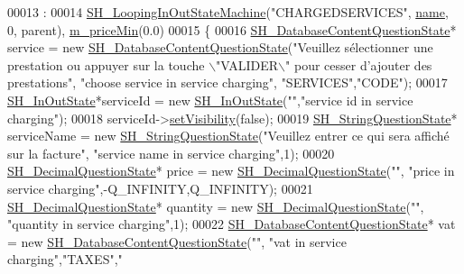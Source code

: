 \begin{DoxyCode}
00013                                                                     :
00014     \hyperlink{classSH__LoopingInOutStateMachine_ab183e4ef00fa1297e942b3a4d78b3523}{SH\_LoopingInOutStateMachine}(\textcolor{stringliteral}{"CHARGEDSERVICES"},
      \hyperlink{classSH__NamedObject_a9f686c6f2a5bcc08ad03d0cee0151f0f}{name}, 0, parent), \hyperlink{classSH__ServiceCharging_a44584a7ff1edd6ae03c4f77544136c13}{m\_priceMin}(0.0)
00015 \{
00016     \hyperlink{classSH__DatabaseContentQuestionState}{SH\_DatabaseContentQuestionState}* service = \textcolor{keyword}{new} 
      \hyperlink{classSH__DatabaseContentQuestionState}{SH\_DatabaseContentQuestionState}(\textcolor{stringliteral}{"Veuillez sélectionner une prestation ou
       appuyer sur la touche \(\backslash\)"VALIDER\(\backslash\)" pour cesser d'ajouter des prestations"}, \textcolor{stringliteral}{"choose service in service charging"},\textcolor{stringliteral}{
      "SERVICES"},\textcolor{stringliteral}{"CODE"});
00017     \hyperlink{classSH__InOutState}{SH\_InOutState}*serviceId = \textcolor{keyword}{new} \hyperlink{classSH__InOutState}{SH\_InOutState}(\textcolor{stringliteral}{""},\textcolor{stringliteral}{"service id in service
       charging"});
00018     serviceId->\hyperlink{classSH__InOutState_a7fdfaa6f600f0ac4a96f238a038ba9ad}{setVisibility}(\textcolor{keyword}{false});
00019     \hyperlink{classSH__StringQuestionState}{SH\_StringQuestionState}* serviceName = \textcolor{keyword}{new} 
      \hyperlink{classSH__StringQuestionState}{SH\_StringQuestionState}(\textcolor{stringliteral}{"Veuillez entrer ce qui sera affiché sur la facture"}, \textcolor{stringliteral}{"service
       name in service charging"},1);
00020     \hyperlink{classSH__DecimalQuestionState}{SH\_DecimalQuestionState}* price = \textcolor{keyword}{new} 
      \hyperlink{classSH__DecimalQuestionState}{SH\_DecimalQuestionState}(\textcolor{stringliteral}{""}, \textcolor{stringliteral}{"price in service charging"},-Q\_INFINITY,Q\_INFINITY);
00021     \hyperlink{classSH__DecimalQuestionState}{SH\_DecimalQuestionState}* quantity = \textcolor{keyword}{new} 
      \hyperlink{classSH__DecimalQuestionState}{SH\_DecimalQuestionState}(\textcolor{stringliteral}{""}, \textcolor{stringliteral}{"quantity in service charging"},1);
00022     \hyperlink{classSH__DatabaseContentQuestionState}{SH\_DatabaseContentQuestionState}* vat = \textcolor{keyword}{new} 
      \hyperlink{classSH__DatabaseContentQuestionState}{SH\_DatabaseContentQuestionState}(\textcolor{stringliteral}{""}, \textcolor{stringliteral}{"vat in service charging"},\textcolor{stringliteral}{"TAXES"},\textcolor{stringliteral}{"
}
\end{DoxyCode}
